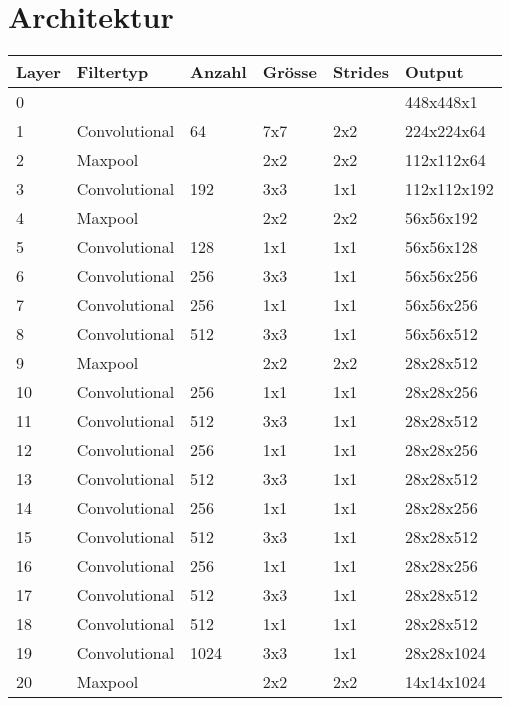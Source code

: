 \newpage
\section{Architektur} 

\begin{table}
\centering
\begin{tabularx}{1.1\textwidth}{|l|l|l|l|l|X|}
\hline
\textbf{Layer} & \textbf{Filtertyp}  & \textbf{Anzahl} & \textbf{Grösse} & \textbf{Strides} & \textbf{Output} \\
\hline 	0	& 					&		&		&		& 448x448x1\\
\hline 	1	& Convolutional		& 64		& 7x7	& 2x2	& 224x224x64	\\
\hline 	2	& Maxpool      		& 		& 2x2	& 2x2	& 112x112x64	\\
\hline 	3   & Convolutional		& 192	& 3x3	& 1x1	& 112x112x192\\
\hline 	4	& Maxpool			& 		& 2x2	& 2x2	& 56x56x192	\\
\hline 	5	& Convolutional		& 128	& 1x1	& 1x1	& 56x56x128	\\
\hline 	6	& Convolutional		& 256	& 3x3	& 1x1	& 56x56x256	\\
\hline 	7	& Convolutional		& 256	& 1x1	& 1x1	& 56x56x256	\\
\hline 	8	& Convolutional		& 512	& 3x3	& 1x1	& 56x56x512	\\
\hline 	9	& Maxpool			&		& 2x2	& 2x2	& 28x28x512	\\
\hline 	10	& Convolutional		& 256	& 1x1	& 1x1	& 28x28x256	\\
\hline 	11	& Convolutional		& 512	& 3x3	& 1x1	& 28x28x512	\\
\hline 	12	& Convolutional		& 256	& 1x1	& 1x1	& 28x28x256	\\
\hline 	13	& Convolutional		& 512	& 3x3	& 1x1	& 28x28x512	\\
\hline 	14	& Convolutional		& 256	& 1x1	& 1x1	& 28x28x256	\\
\hline 	15	& Convolutional		& 512	& 3x3	& 1x1	& 28x28x512	\\
\hline  	16	& Convolutional		& 256	& 1x1	& 1x1	& 28x28x256	\\
\hline  	17	& Convolutional		& 512	& 3x3	& 1x1	& 28x28x512	\\
\hline 	18	& Convolutional		& 512	& 1x1	& 1x1	& 28x28x512	\\
\hline  	19	& Convolutional		& 1024	& 3x3	& 1x1	& 28x28x1024	\\
\hline  	20	& Maxpool			&		& 2x2	& 2x2	& 14x14x1024	\\

\end{tabularx}
\end{table}
